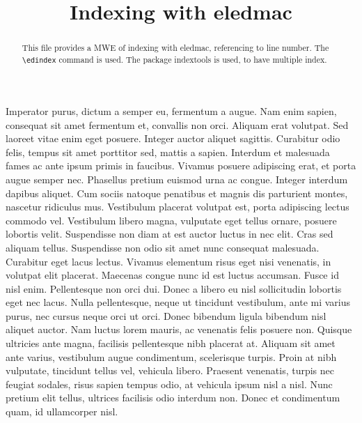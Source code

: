 \documentclass{article}
\begin{document}
\begin{english}
\date{}
\title{Indexing with eledmac}
\maketitle

\begin{abstract}
 This file provides a MWE of indexing with eledmac, referencing to line number.
 The \verb+\edindex+ command is used. The package indextools is used, to have multiple index.
\end{abstract}
\end{english}

\beginnumbering
\pstart
Imperator purus, dictum a semper eu, fermentum a augue. Nam enim sapien, consequat sit amet fermentum et, convallis non orci. Aliquam erat volutpat. Sed laoreet vitae enim eget posuere. Integer auctor aliquet sagittis. Curabitur odio felis, tempus sit amet porttitor sed, mattis a sapien. Interdum et malesuada fames ac ante ipsum primis in faucibus. Vivamus posuere adipiscing erat, et porta augue semper nec.
\pend
\pstart
Phasellus pretium euismod urna ac congue. Integer interdum dapibus aliquet. Cum sociis natoque penatibus et magnis dis parturient montes, nascetur ridiculus mus. Vestibulum placerat volutpat est, porta adipiscing lectus commodo vel. Vestibulum libero magna, vulputate eget tellus ornare, posuere lobortis velit. Suspendisse non diam at est auctor luctus in nec elit. Cras sed aliquam tellus. Suspendisse non odio sit amet nunc consequat malesuada. Curabitur eget lacus lectus. Vivamus elementum risus eget nisi venenatis, in volutpat elit placerat. Maecenas congue nunc id est luctus accumsan. Fusce id nisl enim.
\pend
\pstart
Pellentesque non orci dui. Donec a libero eu nisl sollicitudin lobortis eget nec lacus. Nulla pellentesque, neque ut tincidunt vestibulum, ante mi varius purus, nec cursus neque orci ut orci. Donec bibendum ligula bibendum nisl aliquet auctor. Nam luctus lorem mauris, ac venenatis felis posuere non. Quisque ultricies ante magna, facilisis pellentesque nibh placerat at. Aliquam sit amet ante varius, vestibulum augue condimentum, scelerisque turpis. Proin at nibh vulputate, tincidunt tellus vel, vehicula libero. Praesent venenatis, turpis nec feugiat sodales, risus sapien tempus odio, at vehicula ipsum nisl a nisl. Nunc pretium elit tellus, ultrices facilisis odio interdum non. Donec et condimentum quam, id ullamcorper nisl.
\pend
\endnumbering

\newpage
\printindex

\printindex[name]
\end{document}
